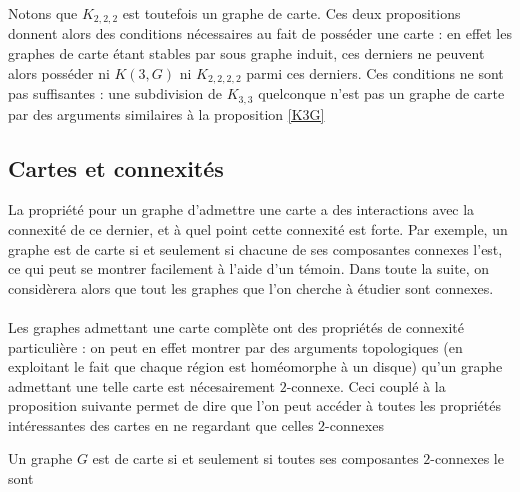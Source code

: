 \documentclass{scrartcl}
\begin{document}
\begin{flushleft}
Notons que $K_{2,2,2}$ est toutefois un graphe de carte. Ces deux propositions donnent alors des conditions nécessaires au fait
de posséder une carte : en effet les graphes de carte étant stables par sous graphe induit, ces derniers ne peuvent alors
posséder ni $K(3, G)$ ni $K_{2,2,2,2}$ parmi ces derniers. Ces conditions ne sont pas suffisantes : une subdivision
de $K_{3,3}$ quelconque n'est pas un graphe de carte par des arguments similaires à la proposition \ref{K3G}

\subsection{Cartes et connexités}\label{cartesetconnex}

La propriété pour un graphe d'admettre une carte a des interactions avec la connexité de ce dernier, et à quel point cette connexité
est forte. Par exemple, un graphe est de carte si et seulement si chacune de ses composantes connexes l'est, ce qui peut se montrer
facilement à l'aide d'un témoin. Dans toute la suite, on considèrera alors que tout les graphes que l'on cherche à étudier sont connexes.
\\~\\
Les graphes admettant une carte complète ont des propriétés de connexité particulière : on peut en effet montrer par des arguments
topologiques (en exploitant le fait que chaque région est homéomorphe à un disque) qu'un graphe admettant une telle carte
est nécesairement $2$-connexe. Ceci couplé à la proposition suivante permet de dire que l'on peut accéder à toutes les propriétés
intéressantes des cartes en ne regardant que celles $2$-connexes

\begin{prop}\label{suffbiconn}\cite{FptMap}
    Un graphe $G$ est de carte si et seulement si toutes ses composantes $2$-connexes le sont
\end{prop}


\end{flushleft}
\end{document}
